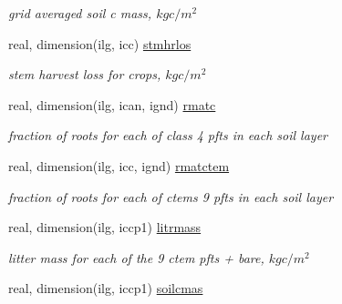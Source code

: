 \begin{DoxyCompactItemize}
\begin{DoxyCompactList}\small\item\em grid averaged soil c mass, $kg c/m^2$ \end{DoxyCompactList}\item 
\hypertarget{structctem__statevars_1_1veg__gat_a74be67212c06ef80e7a5a5bfbdc3f506}{}real, dimension(ilg, icc) \hyperlink{structctem__statevars_1_1veg__gat_a74be67212c06ef80e7a5a5bfbdc3f506}{stmhrlos}\label{structctem__statevars_1_1veg__gat_a74be67212c06ef80e7a5a5bfbdc3f506}

\begin{DoxyCompactList}\small\item\em stem harvest loss for crops, $kg c/m^2$ \end{DoxyCompactList}\item 
\hypertarget{structctem__statevars_1_1veg__gat_aa454f0b52d4bb45c9a0e53e27151dd7e}{}real, dimension(ilg, ican, ignd) \hyperlink{structctem__statevars_1_1veg__gat_aa454f0b52d4bb45c9a0e53e27151dd7e}{rmatc}\label{structctem__statevars_1_1veg__gat_aa454f0b52d4bb45c9a0e53e27151dd7e}

\begin{DoxyCompactList}\small\item\em fraction of roots for each of class\textquotesingle{} 4 pfts in each soil layer \end{DoxyCompactList}\item 
\hypertarget{structctem__statevars_1_1veg__gat_a035474978a3f15fd37807c1f9113cbc6}{}real, dimension(ilg, icc, ignd) \hyperlink{structctem__statevars_1_1veg__gat_a035474978a3f15fd37807c1f9113cbc6}{rmatctem}\label{structctem__statevars_1_1veg__gat_a035474978a3f15fd37807c1f9113cbc6}

\begin{DoxyCompactList}\small\item\em fraction of roots for each of ctem\textquotesingle{}s 9 pfts in each soil layer \end{DoxyCompactList}\item 
\hypertarget{structctem__statevars_1_1veg__gat_aa470a367a8e421a52b2744b0e6e4bde4}{}real, dimension(ilg, iccp1) \hyperlink{structctem__statevars_1_1veg__gat_aa470a367a8e421a52b2744b0e6e4bde4}{litrmass}\label{structctem__statevars_1_1veg__gat_aa470a367a8e421a52b2744b0e6e4bde4}

\begin{DoxyCompactList}\small\item\em litter mass for each of the 9 ctem pfts + bare, $kg c/m^2$ \end{DoxyCompactList}\item 
\hypertarget{structctem__statevars_1_1veg__gat_ad53d9a9c1329fcfabb930c95482fffbf}{}real, dimension(ilg, iccp1) \hyperlink{structctem__statevars_1_1veg__gat_ad53d9a9c1329fcfabb930c95482fffbf}{soilcmas}\label{structctem__statevars_1_1veg__gat_ad53d9a9c1329fcfabb930c95482fffbf}


\end{DoxyCompactItemize}
